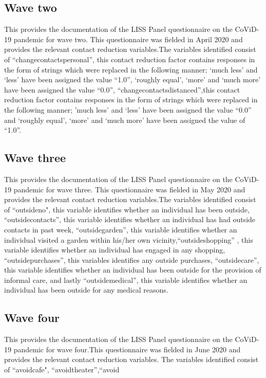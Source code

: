 \documentclass[11pt, a4paper, leqno]{article}
\begin{document}
\subsection{Wave two}
 This provides the documentation of the LISS Panel questionnaire on the CoViD-19 pandemic for wave two. This questionnaire was fielded in April 2020 and provides the relevant contact reduction variables.The variables identified consist of ``change\textunderscore contacts\textunderscore personal'', this contact reduction factor contains responses in the form of strings which were replaced in the following manner; `much less' and ‘less’ have been assigned the value ``1.0'', ‘roughly equal’, ‘more’ and ‘much more’ have been assigned the value  ``0.0'', ``change\textunderscore contacts\textunderscore distanced'',this contact reduction factor contains responses in the form of strings which were replaced in the following manner;  'much less' and `less' have been assigned the value ``0.0'' and `roughly equal', `more' and `much more' have been assigned the value of ``1.0''.

\subsection{Wave three}
This provides the documentation of the LISS Panel questionnaire on the CoViD-19 pandemic for wave three. This questionnaire was fielded in May 2020 and provides the relevant contact reduction variables.The variables identified consist of ``outside\textunderscore no", this variable identifies whether an individual has been outside, ``outside\textunderscore contacts'', this variable identifies whether an individual has had outside contacts in past week, ``outside\textunderscore garden'', this variable identifies whether an individual visited a garden within his/her own vicinity,``outside\textunderscore shopping'' , this variable identifies whether an individual has engaged in any shopping, ``outside\textunderscore purchases'', this variables identifies any outside purchases, ``outside\textunderscore care'', this variable identifies whether an individual has been outside for the provision of informal care, and lastly ``outside\textunderscore medical'', this variable identifies whether an individual has been outside for any medical reasons. 

\subsection{Wave four}
This provides the documentation of the LISS Panel questionnaire on the CoViD-19 pandemic for wave four.This questionnaire was fielded in June 2020 and provides the relevant contact reduction variables. The variables identified consist of ``avoid\textunderscore cafe", ``avoid\textunderscore theater'',``avoid\textunderscore 
\end{document}
